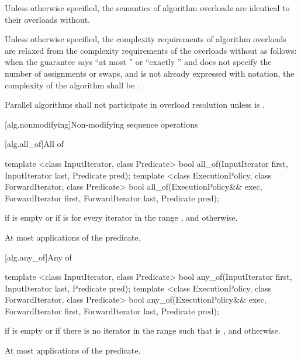 \pnum
Unless otherwise specified, the semantics of  algorithm
overloads are identical to their overloads without.

\pnum
Unless otherwise specified, the complexity requirements of 
algorithm overloads are relaxed from the complexity requirements of the overloads
without as follows:
when the guarantee says ``at most '' or ``exactly ''
and does not specify the number of assignments or swaps, and 
is not already expressed with  \bigoh{} notation, the complexity of the algorithm
shall be .

\pnum
Parallel algorithms shall not participate in overload resolution unless
 is .

[alg.nonmodifying]{Non-modifying sequence operations}

[alg.all_of]{All of}

%
\begin{itemdecl}
template <class InputIterator, class Predicate>
  bool all_of(InputIterator first, InputIterator last, Predicate pred);
template <class ExecutionPolicy, class ForwardIterator, class Predicate>
  bool all_of(ExecutionPolicy&& exec, ForwardIterator first, ForwardIterator last,
              Predicate pred);
\end{itemdecl}

\begin{itemdescr}
\pnum
\returns {} if
 is empty or if
 is  for every iterator  in the range , and  otherwise.

\pnum
\complexity At most  applications of the predicate.
\end{itemdescr}

[alg.any_of]{Any of}

%
\begin{itemdecl}
template <class InputIterator, class Predicate>
  bool any_of(InputIterator first, InputIterator last, Predicate pred);
template <class ExecutionPolicy, class ForwardIterator, class Predicate>
  bool any_of(ExecutionPolicy&& exec, ForwardIterator first, ForwardIterator last,
              Predicate pred);
\end{itemdecl}

\begin{itemdescr}
\pnum
\returns {} if  is empty or
if there is no iterator  in the range
 such that  is , and  otherwise.

\pnum
\complexity At most  applications of the predicate.
\end{itemdescr}

